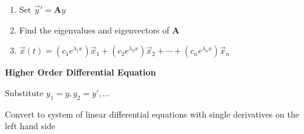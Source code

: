 \documentclass[10pt]{article}
\newcommand{\matr}[1]{\mathbf{#1}}
\newcommand\heading[1]{\medskip\textbf{#1}\medskip}
\begin{document}
\begin{multicols*}{3}
\begin{enumerate}[noitemsep,topsep=0pt]
    \item Set $\vec y'=\matr{A}y$
    \item Find the eigenvalues and eigenvectors of $\matr{A}$
    \item $\vec x(t)=(c_1e^{\lambda_1 x})\vec x_1+(c_2e^{\lambda_2 x})\vec x_2+\cdots+(c_ne^{\lambda_n x})\vec x_n$
\end{enumerate}

\heading{Higher Order Differential Equation}

Substitute $y_1=y,y_2=y',\ldots$

Convert to system of linear differential equations with single derivatives on the left hand side

\end{multicols*}
\end{document}
